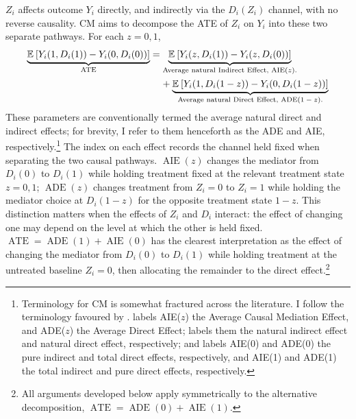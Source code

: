 $Z_i$ affects outcome $Y_i$ directly, and indirectly via the $D_i(Z_i)$ channel, with no reverse causality.
CM aims to decompose the ATE of $Z_i$ on $Y_i$ into these two separate pathways.
For each $z= 0,1$,
\begin{align*}
    \underbrace{ \mathbb{E}_{} \left[ Y_i(1, D_i(1)) - Y_i(0, D_i(0)) \right]}_{
        \text{ATE}} &=
    \underbrace{ \mathbb{E}_{} \left[ Y_i(z, D_i(1)) - Y_i(z, D_i(0)) \right]}_{
        \text{Average natural Indirect Effect, AIE($z$).}} \\
    &\;\;\;\;+
    \underbrace{ \mathbb{E}_{} \left[ Y_i(1, D_i(1-z)) - Y_i(0, D_i(1-z)) \right]}_{
        \text{Average natural Direct Effect, ADE($1-z$).}
    }
\end{align*}
These parameters are conventionally termed the average natural direct and indirect effects;
for brevity, I refer to them henceforth as the ADE and AIE, respectively.\footnote{
    Terminology for CM is somewhat fractured across the literature.
    I follow the terminology favoured by \cite{huber2019review}.
    \cite{imai2010identification} labels AIE($z$) the Average Causal Mediation Effect, and ADE($z$) the Average Direct Effect; \cite{pearl2003direct} labels them the natural indirect effect and natural direct effect, respectively; and \cite{robins2003semantics} labels AIE(0) and ADE(0) the pure indirect and total direct effects, respectively, and AIE(1) and ADE(1) the total indirect and pure direct effects, respectively.
}
The index on each effect records the channel held fixed when separating the two causal pathways.
$\operatorname{AIE}(z)$ changes the mediator from $D_i(0)$ to $D_i(1)$ while holding treatment fixed at the relevant treatment state $z = 0,1$;
$\operatorname{ADE}(z)$ changes treatment from $Z_i=0$ to $Z_i=1$ while holding the mediator choice at $D_i(1-z)$ for the opposite treatment state $1-z$.
This distinction matters when the effects of $Z_i$ and $D_i$ interact: the effect of changing one may depend on the level at which the other is held fixed.
$\operatorname{ATE} = \operatorname{ADE}(1) + \operatorname{AIE}(0)$ has the clearest interpretation as the effect of changing the mediator from $D_i(0)$ to $D_i(1)$ while holding treatment at the untreated baseline $Z_i=0$, then allocating the remainder to the direct effect.\footnote{
    All arguments developed below apply symmetrically to the alternative decomposition, $\operatorname{ATE}=\operatorname{ADE}(0)+\operatorname{AIE}(1)$.
}

